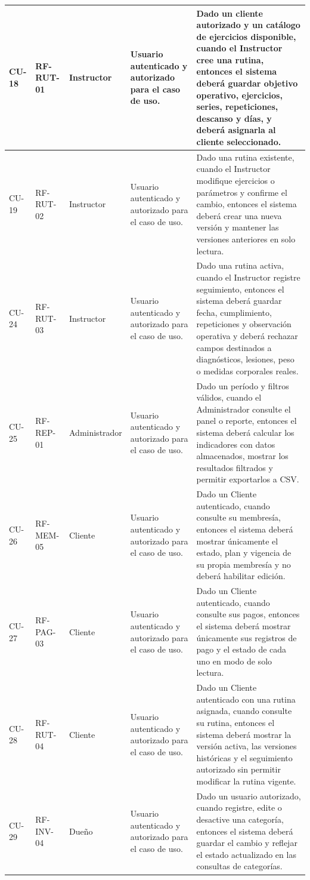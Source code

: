 \begin{landscape}
\begin{longtable}{|p{1.2cm}|p{1.9cm}|p{2.4cm}|p{5.0cm}|p{9.2cm}|}
CU-18 & RF-RUT-01 & Instructor & Usuario autenticado y autorizado para el caso de uso. & Dado un cliente autorizado y un catálogo de ejercicios disponible, cuando el Instructor cree una rutina, entonces el sistema deberá guardar objetivo operativo, ejercicios, series, repeticiones, descanso y días, y deberá asignarla al cliente seleccionado. \\ \hline
CU-19 & RF-RUT-02 & Instructor & Usuario autenticado y autorizado para el caso de uso. & Dado una rutina existente, cuando el Instructor modifique ejercicios o parámetros y confirme el cambio, entonces el sistema deberá crear una nueva versión y mantener las versiones anteriores en solo lectura. \\ \hline
CU-24 & RF-RUT-03 & Instructor & Usuario autenticado y autorizado para el caso de uso. & Dado una rutina activa, cuando el Instructor registre seguimiento, entonces el sistema deberá guardar fecha, cumplimiento, repeticiones y observación operativa y deberá rechazar campos destinados a diagnósticos, lesiones, peso o medidas corporales reales. \\ \hline
CU-25 & RF-REP-01 & Administrador & Usuario autenticado y autorizado para el caso de uso. & Dado un período y filtros válidos, cuando el Administrador consulte el panel o reporte, entonces el sistema deberá calcular los indicadores con datos almacenados, mostrar los resultados filtrados y permitir exportarlos a CSV. \\ \hline
CU-26 & RF-MEM-05 & Cliente & Usuario autenticado y autorizado para el caso de uso. & Dado un Cliente autenticado, cuando consulte su membresía, entonces el sistema deberá mostrar únicamente el estado, plan y vigencia de su propia membresía y no deberá habilitar edición. \\ \hline
CU-27 & RF-PAG-03 & Cliente & Usuario autenticado y autorizado para el caso de uso. & Dado un Cliente autenticado, cuando consulte sus pagos, entonces el sistema deberá mostrar únicamente sus registros de pago y el estado de cada uno en modo de solo lectura. \\ \hline
CU-28 & RF-RUT-04 & Cliente & Usuario autenticado y autorizado para el caso de uso. & Dado un Cliente autenticado con una rutina asignada, cuando consulte su rutina, entonces el sistema deberá mostrar la versión activa, las versiones históricas y el seguimiento autorizado sin permitir modificar la rutina vigente. \\ \hline
CU-29 & RF-INV-04 & Dueño & Usuario autenticado y autorizado para el caso de uso. & Dado un usuario autorizado, cuando registre, edite o desactive una categoría, entonces el sistema deberá guardar el cambio y reflejar el estado actualizado en las consultas de categorías. \\ \hline

\end{longtable}
\end{landscape}
